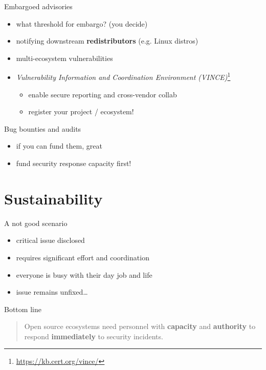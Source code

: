 \documentclass[ignorenonframetext,aspectratio=169,12pt]{beamer}
\begin{document}
\begin{frame}{Embargoed advisories}
  \begin{itemize}
    \item what threshold for embargo? (you decide)
    \item notifying downstream {\bf redistributors} (e.g. Linux distros)
    \item multi-ecosystem vulnerabilities
    \item {\em Vulnerability Information and Coordination
      Environment (VINCE)}\footnote{\url{https://kb.cert.org/vince/}}
      \begin{itemize}
        \item enable secure reporting and cross-vendor collab
        \item register your project / ecosystem!
      \end{itemize}
  \end{itemize}
\end{frame}

\begin{frame}{Bug bounties and audits}
  \begin{itemize}
    \item if you can fund them, great
    \item fund security response capacity first!
  \end{itemize}
\end{frame}




\section{Sustainability}

\begin{frame}{A not good scenario}
  \begin{itemize}
    \item critical issue disclosed
    \item requires significant effort and coordination
    \item everyone is busy with their day job and life
    \item issue remains unfixed\ldots{}
  \end{itemize}
\end{frame}

\begin{frame}{Bottom line}
\large
\begin{quote}
\raggedright
  Open source ecosystems need personnel with {\bf capacity} and
  {\bf authority} to respond {\bf immediately} to security incidents.
\end{quote}
\end{frame}
\end{document}
